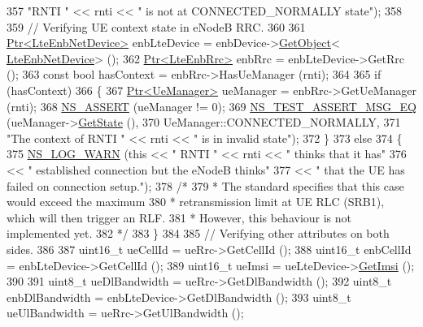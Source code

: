 \begin{DoxyCode}
357                          \textcolor{stringliteral}{"RNTI "} << rnti << \textcolor{stringliteral}{" is not at CONNECTED\_NORMALLY state"});
358 
359   \textcolor{comment}{// Verifying UE context state in eNodeB RRC.}
360 
361   \hyperlink{classns3_1_1Ptr}{Ptr<LteEnbNetDevice>} enbLteDevice = enbDevice->\hyperlink{classns3_1_1Object_a13e18c00017096c8381eb651d5bd0783}{GetObject}<
      \hyperlink{classns3_1_1LteEnbNetDevice}{LteEnbNetDevice}> ();
362   \hyperlink{classns3_1_1Ptr}{Ptr<LteEnbRrc>} enbRrc = enbLteDevice->GetRrc ();
363   \textcolor{keyword}{const} \textcolor{keywordtype}{bool} hasContext = enbRrc->HasUeManager (rnti);
364 
365   \textcolor{keywordflow}{if} (hasContext)
366     \{
367       \hyperlink{classns3_1_1Ptr}{Ptr<UeManager>} ueManager = enbRrc->GetUeManager (rnti);
368       \hyperlink{assert_8h_a6dccdb0de9b252f60088ce281c49d052}{NS\_ASSERT} (ueManager != 0);
369       \hyperlink{group__testing_ga2a9d78cffb3db8e867c35fff0b698cf5}{NS\_TEST\_ASSERT\_MSG\_EQ} (ueManager->\hyperlink{classns3_1_1UeManager_a401868bb61523c594c69024e2231467a}{GetState} (),
370                              UeManager::CONNECTED\_NORMALLY,
371                              \textcolor{stringliteral}{"The context of RNTI "} << rnti << \textcolor{stringliteral}{" is in invalid state"});
372     \}
373   \textcolor{keywordflow}{else}
374     \{
375        \hyperlink{group__logging_gade7208b4009cdf0e25783cd26766f559}{NS\_LOG\_WARN} (\textcolor{keyword}{this} << \textcolor{stringliteral}{" RNTI "} << rnti << \textcolor{stringliteral}{" thinks that it has"}
376                          << \textcolor{stringliteral}{" established connection but the eNodeB thinks"}
377                          << \textcolor{stringliteral}{" that the UE has failed on connection setup."});
378        \textcolor{comment}{/*}
379 \textcolor{comment}{        * The standard specifies that this case would exceed the maximum}
380 \textcolor{comment}{        * retransmission limit at UE RLC (SRB1), which will then trigger an RLF.}
381 \textcolor{comment}{        * However, this behaviour is not implemented yet.}
382 \textcolor{comment}{        */}
383     \}
384 
385   \textcolor{comment}{// Verifying other attributes on both sides.}
386 
387   uint16\_t ueCellId = ueRrc->GetCellId ();
388   uint16\_t enbCellId = enbLteDevice->GetCellId ();
389   uint16\_t ueImsi = ueLteDevice->\hyperlink{classns3_1_1LteUeNetDevice_a673405bfed4b45c5714f17b0c3bad334}{GetImsi} ();
390 
391   uint8\_t ueDlBandwidth = ueRrc->GetDlBandwidth ();
392   uint8\_t enbDlBandwidth = enbLteDevice->GetDlBandwidth ();
393   uint8\_t ueUlBandwidth = ueRrc->GetUlBandwidth ();

\end{DoxyCode}
